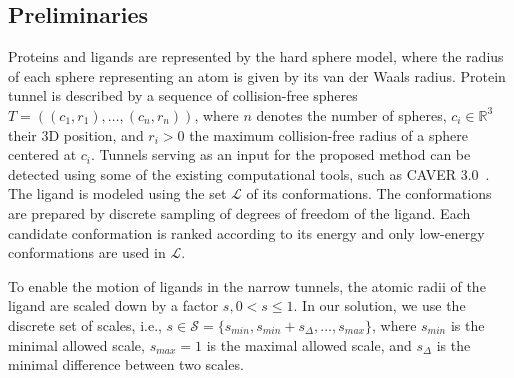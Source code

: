 \documentclass[usletter, 10pt, conference]{ieeeconf} %
\def\R{\mathbb{R}}
\def\smin{s_{min}}
\def\smax{s_{max}}
\def\sdelta{s_{\Delta}}
\def\L{\mathcal{L}}
\def\S{\mathcal{S}}
\begin{document}
\subsection{Preliminaries}

Proteins and ligands are represented by the hard sphere model, where the radius of each sphere representing an atom is given by its van der Waals radius.
Protein tunnel is described by a sequence of collision-free spheres 
$T=( (c_1, r_1),\ldots,(c_n,r_n) )$, where $n$ denotes the number of spheres,
$c_i \in \R^3$ their 3D position, and $r_i > 0$ the maximum collision-free radius of a sphere centered at $c_i$. 
Tunnels serving as an input for the proposed method can be detected using some of the existing computational tools, such as CAVER 3.0~\cite{caver3}.
The ligand is modeled using the set $\L$ of its conformations.
The conformations are prepared by discrete sampling of degrees of freedom of the ligand. %
Each candidate conformation is ranked according to its energy and only low-energy conformations are used in $\L$.

To enable the motion of ligands in the narrow tunnels, the atomic radii of the ligand are scaled down by a factor $s, 0 < s \le 1$.
In our solution, we use the discrete set of scales, i.e., $s \in \S=\{\smin, \smin+\sdelta, \ldots, \smax\}$, where 
$\smin$ is the minimal allowed scale, $\smax=1$ is the maximal allowed scale, and $\sdelta$ is the minimal difference between two scales.
\end{document}
